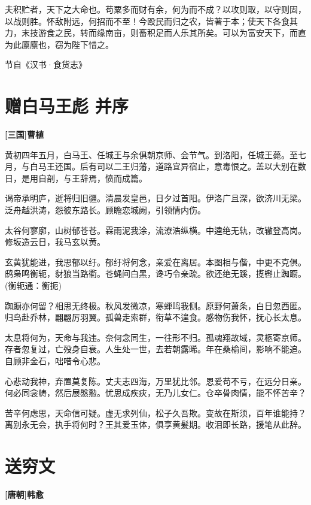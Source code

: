 \documentclass[UTF8,titlepage,oneside]{ctexbook}
\begin{document}
夫积贮者，天下之大命也。苟粟多而财有余，何为而不成？以攻则取，以守则固，以战则胜。怀敌附远，何招而不至！今殴民而归之农，皆著于本；使天下各食其力，末技游食之民，转而缘南亩，则畜积足而人乐其所矣。可以为富安天下，而直为此廪廪也，窃为陛下惜之。


节自《汉书·食货志》



\chapter*{赠白马王彪 并序}
\begin{center}
	\textbf{[三国]曹植}
\end{center}

黄初四年五月，白马王、任城王与余俱朝京师、会节气。到洛阳，任城王薨。至七月，与白马王还国。后有司以二王归藩，道路宜异宿止，意毒恨之。盖以大别在数日，是用自剖，与王辞焉，愤而成篇。

谒帝承明庐，逝将归旧疆。清晨发皇邑，日夕过首阳。伊洛广且深，欲济川无梁。泛舟越洪涛，怨彼东路长。顾瞻恋城阙，引领情内伤。

太谷何寥廓，山树郁苍苍。霖雨泥我涂，流潦浩纵横。中逵绝无轨，改辙登高岗。修坂造云日，我马玄以黄。

玄黄犹能进，我思郁以纡。郁纡将何念，亲爱在离居。本图相与偕，中更不克俱。鸱枭鸣衡轭，豺狼当路衢。苍蝇间白黑，谗巧令亲疏。欲还绝无蹊，揽辔止踟蹰。(衡轭通：衡扼)

踟蹰亦何留？相思无终极。秋风发微凉，寒蝉鸣我侧。原野何萧条，白日忽西匿。归鸟赴乔林，翩翩厉羽翼。孤兽走索群，衔草不遑食。感物伤我怀，抚心长太息。

太息将何为，天命与我违。奈何念同生，一往形不归。孤魂翔故域，灵柩寄京师。存者忽复过，亡殁身自衰。人生处一世，去若朝露晞。年在桑榆间，影响不能追。自顾非金石，咄唶令心悲。

心悲动我神，弃置莫复陈。丈夫志四海，万里犹比邻。恩爱苟不亏，在远分日亲。何必同衾帱，然后展慇懃。忧思成疾疢，无乃儿女仁。仓卒骨肉情，能不怀苦辛？

苦辛何虑思，天命信可疑。虚无求列仙，松子久吾欺。变故在斯须，百年谁能持？离别永无会，执手将何时？王其爱玉体，俱享黄髪期。收泪即长路，援笔从此辞。


\chapter*{送穷文}
\begin{center}
	\textbf{[唐朝]韩愈}
\end{center}
\end{document}
